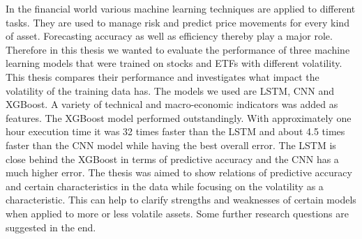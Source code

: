 \documentclass[a4paper,12pt]{report}
\begin{document}
In the financial world various machine learning techniques are applied to different tasks. They are used to manage risk and predict price movements for every kind of asset. Forecasting accuracy as well as efficiency thereby play a major role. Therefore in this thesis we wanted to evaluate the performance of three machine learning models that were trained on stocks and ETFs with different volatility. This thesis compares their performance and investigates what impact the volatility of the training data has. The models we used are LSTM, CNN and XGBoost. A variety of technical and macro-economic indicators was added as features. The XGBoost model performed outstandingly. With approximately one hour execution time it was 32 times faster than the LSTM and about 4.5 times faster than the CNN model while having the best overall error. The LSTM is close behind the XGBoost in terms of predictive accuracy and the CNN has a much higher error. The thesis was aimed to show relations of predictive accuracy and certain characteristics in the data while focusing on the volatility as a characteristic. This can help to clarify strengths and weaknesses of certain models when applied to more or less volatile assets. Some further research questions are suggested in the end.
\vspace{6cm}
\vspace*{\fill}
\end{document}

